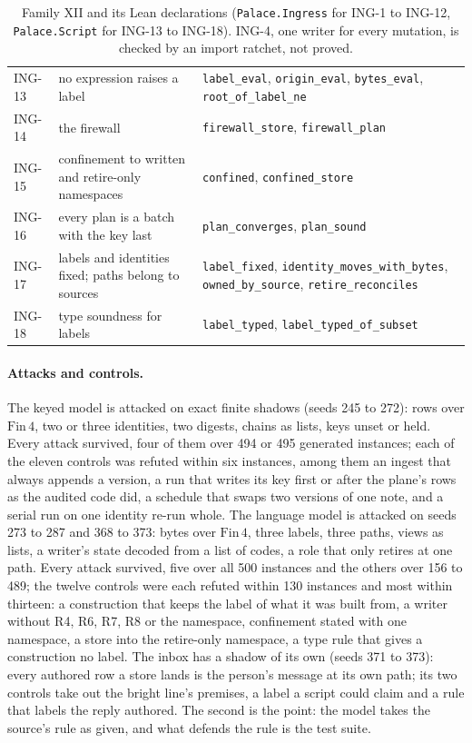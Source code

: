 \documentclass[11pt]{article}
\theoremstyle{plain}
\theoremstyle{definition}
\theoremstyle{remark}
\newcommand{\lean}[1]{\texttt{#1}}
\newcommand{\ing}[1]{ING-#1}
\begin{document}
\begin{table}[t]
\begin{tabular}{>{\raggedright\arraybackslash}p{}>{\raggedright\arraybackslash}p{}>{\raggedright\arraybackslash}p{}}
\ing{13} & no expression raises a label & \lean{label\_eval}, \lean{origin\_eval}, \lean{bytes\_eval}, \lean{root\_of\_label\_ne} \\
\ing{14} & the firewall & \lean{firewall\_store}, \lean{firewall\_plan} \\
\ing{15} & confinement to written and retire-only namespaces & \lean{confined}, \lean{confined\_store} \\
\ing{16} & every plan is a batch with the key last & \lean{plan\_converges}, \lean{plan\_sound} \\
\ing{17} & labels and identities fixed; paths belong to sources & \lean{label\_fixed}, \lean{identity\_moves\_with\_bytes}, \lean{owned\_by\_source}, \lean{retire\_reconciles} \\
\ing{18} & type soundness for labels & \lean{label\_typed}, \lean{label\_typed\_of\_subset} \\
\bottomrule
\end{tabular}
\caption{Family XII and its Lean declarations (\lean{Palace.Ingress} for \ing{1} to \ing{12}, \lean{Palace.Script} for \ing{13} to \ing{18}). \ing{4}, one writer for every mutation, is checked by an import ratchet, not proved.}
\label{tab:laws}
\end{table}

\paragraph{Attacks and controls.}
The keyed model is attacked on exact finite shadows (seeds 245 to 272): rows over
$\mathrm{Fin}\,4$, two or three identities, two digests, chains as lists, keys unset or held.
Every attack survived, four of them over 494 or 495 generated instances; each of the eleven
controls was refuted within six instances, among them an ingest that always appends a version,
a run that writes its key first or after the plane's rows as the audited code did, a schedule
that swaps two versions of one note, and a serial run on one identity re-run whole. The language
model is attacked on seeds 273 to 287 and 368 to 373: bytes over $\mathrm{Fin}\,4$, three labels, three paths,
views as lists, a writer's state decoded from a list of codes, a role that only retires at one
path. Every attack survived, five over all 500 instances and the others over 156 to 489; the
twelve controls were each refuted within 130 instances and most within thirteen: a construction
that keeps the label of what it was built from, a writer without R4, R6, R7, R8 or the namespace,
confinement stated with one namespace, a store into the retire-only namespace, a type rule that
gives a construction no label. The inbox has a shadow of its own (seeds 371 to 373): every
authored row a store lands is the person's message at its own path; its two controls take out
the bright line's premises, a label a script could claim and a rule that labels the reply
authored. The second is the point: the model takes the source's rule as given, and what defends
the rule is the test suite.
\end{document}
